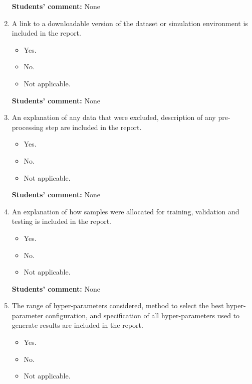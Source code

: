 \documentclass{article}
\begin{document}
\begin{enumerate}
    \textbf{Students' comment:} None
    
    \item A link to a downloadable version of the dataset or simulation environment is included in the report.
    \begin{itemize}
        \item [\faSquareO] Yes.
        \item [\faSquareO] No.
        \item [\faSquareO] Not applicable.
    \end{itemize}
    
    \textbf{Students' comment:} None
    
    \item An explanation of any data that were excluded, description of any pre-processing step are included in the report.
    \begin{itemize}
        \item [\faSquareO] Yes.
        \item [\faSquareO] No.
        \item [\faSquareO] Not applicable.
    \end{itemize}
    
    \textbf{Students' comment:} None
    
    \item An explanation of how samples were allocated for training, validation and testing is included in the report.
    \begin{itemize}
        \item [\faSquareO] Yes.
        \item [\faSquareO] No.
        \item [\faSquareO] Not applicable.
    \end{itemize}
    
    \textbf{Students' comment:} None
    
    \item The range of hyper-parameters considered, method to select the best hyper-parameter
configuration, and specification of all hyper-parameters used to generate results are included in the report.
    \begin{itemize}
        \item [\faSquareO] Yes.
        \item [\faSquareO] No.
        \item [\faSquareO] Not applicable.
    \end{itemize}
    

\end{enumerate}
\end{document}

